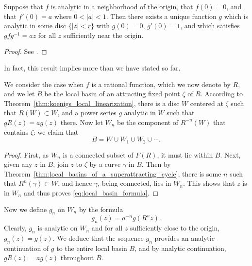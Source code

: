 \begin{theorem}
    \label{thm:koenigs_local_linearization}
    Suppose that $f$ is analytic in a neighborhood of the origin, that $f(0) =
    0$, and that $f'(0) = a$ where $0 < |a| < 1$. Then there exists a unique
    function $g$ which is analytic in some disc $\{|z| < r\}$ with $g(0) = 0$,
    $g'(0) = 1$, and which satisfies $g f g^{-1} = az$ for all $z$ sufficiently
    near the origin.
\end{theorem}
\begin{proof}
    See \cite[106]{Beardon1991}.
\end{proof}

In fact, this result implies more than we have stated so far.

\begin{remark}[$B = W \cup W_1 \cup W_2 \cup \cdots$]
    We consider the case when $f$ is a rational function, which we now denote by
    $R$, and we let $B$ be the local basin of an attracting fixed point $\zeta$
    of $R$. According to Theorem~\ref{thm:koenigs_local_linearization}, there is
    a disc $W$ centered at $\zeta$ such that $R(W) \subset W$, and a power
    series $g$ analytic in $W$ such that $g R(z) = a g(z)$ there. Now let $W_n$
    be the component of $R^{-n}(W)$ that contains $\zeta$: we claim that
    \begin{equation}
        \label{eq:local_basin_formula}
        B = W \cup W_1 \cup W_2 \cup \cdots .
    \end{equation}
\end{remark}
\begin{proof}
    First, as $W_n$ is a connected subset of $F(R)$, it must lie within $B$.
    Next, given any $z$ in $B$, join $z$ to $\zeta$ by a curve $\gamma$ in $B$.
    Then by Theorem~\ref{thm:local_basins_of_a_superattracting_cycle}, there is
    some $n$ such that $R^n(\gamma) \subset W$, and hence $\gamma$, being
    connected, lies in $W_n$. This shows that $z$ is in $W_n$ and thus proves
    \eqref{eq:local_basin_formula}.
\end{proof}

\begin{remark}
    Now we define $g_n$ on $W_n$ by the formula
    \begin{equation*}
        g_n(z) = a^{-n} g(R^n z).
    \end{equation*}
    Clearly, $g_n$ is analytic on $W_n$ and for all $z$ sufficiently close to
    the origin, $g_n(z) = g(z)$. We deduce that the sequence $g_n$ provides an
    analytic continuation of $g$ to the entire local basin $B$, and by analytic
    continuation, $g R(z) = a g(z)$ throughout $B$.
\end{remark}

